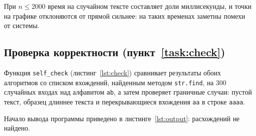 При $n \leq 2000$ время на случайном тексте составляет доли миллисекунды, и точки на
графике отклоняются от прямой сильнее: на таких временах заметны помехи от системы.

\subsection{Проверка корректности (пункт~\ref{task:check})}
Функция \texttt{self\_check} (листинг~\ref{lst:check}) сравнивает результаты обоих алгоритмов
со списком вхождений, найденным методом \texttt{str.find}, на 300 случайных входах над
алфавитом \texttt{ab}, а затем проверяет граничные случаи: пустой текст, образец длиннее
текста и перекрывающиеся вхождения \texttt{aa} в строке \texttt{aaaa}.


Начало вывода программы приведено в листинге~\ref{lst:output}: расхождений не найдено.

